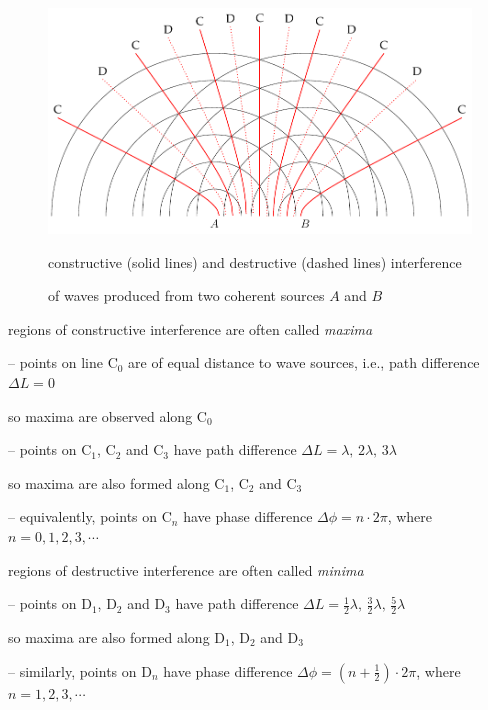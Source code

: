 \begin{figure}[htp]
	\centering
	\includegraphics[width=1\textwidth]{interference.pdf}
	
	constructive (solid lines) and destructive (dashed lines) interference 
	
	of waves produced from two coherent sources $A$ and $B$
\end{figure}

\cmt regions of constructive interference are often called \emph{maxima}

\begin{compactitem}
	\item[--] points on line C$_0$ are of equal distance to wave sources, i.e., path difference $\Delta L = 0$
	
	so maxima are observed along C$_0$
	
	\item[--] points on C$_1$, C$_2$ and C$_3$ have path difference $\Delta L = \lambda, \, 2\lambda, \, 3\lambda$
	
	so maxima are also formed along C$_1$, C$_2$ and C$_3$
	
	\item[--] equivalently, points on C$_n$ have phase difference $\Delta \phi = n\cdot 2\pi$, where $n=0,1,2,3,\cdots$
\end{compactitem} 

\cmt regions of destructive interference are often called \emph{minima}

\begin{compactitem}
	\item[--] points on D$_1$, D$_2$ and D$_3$ have path difference $\Delta L = \frac{1}{2}\lambda, \, \frac{3}{2}\lambda, \, \frac{5}{2}\lambda$
	
	so maxima are also formed along D$_1$, D$_2$ and D$_3$
	
	\item[--] similarly, points on D$_n$ have phase difference $\Delta \phi = \left( n+\frac{1}{2} \right) \cdot 2\pi$, where $n=1,2,3,\cdots$
\end{compactitem} 






